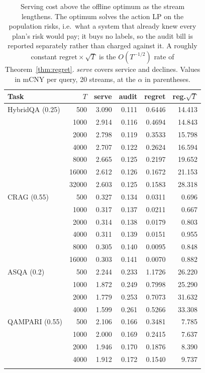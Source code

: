 \begin{table}[t]
\centering
\caption{Serving cost above the offline optimum as the stream lengthens. The optimum solves the action LP on the population risks, i.e.\ what a system that already knew every plan's risk would pay; it buys no labels, so the audit bill is reported separately rather than charged against it. A roughly constant $\mathrm{regret}\times\sqrt{T}$ is the $O(T^{-1/2})$ rate of Theorem~\ref{thm:regret}. \emph{serve} covers service and declines. Values in mCNY per query, 20 streams, at the $\alpha$ in parentheses.}
\label{tab:regret}
\footnotesize
\setlength{\tabcolsep}{4pt}
\begin{tabular}{lrrrrr}
\toprule
Task & $T$ & serve & audit & regret & reg.$\sqrt{T}$ \\
\midrule
HybridQA (0.25) & 500 & 3.090 & 0.111 & 0.6446 & 14.413 \\
 & 1000 & 2.914 & 0.116 & 0.4694 & 14.843 \\
 & 2000 & 2.798 & 0.119 & 0.3533 & 15.798 \\
 & 4000 & 2.707 & 0.122 & 0.2624 & 16.594 \\
 & 8000 & 2.665 & 0.125 & 0.2197 & 19.652 \\
 & 16000 & 2.612 & 0.126 & 0.1672 & 21.153 \\
 & 32000 & 2.603 & 0.125 & 0.1583 & 28.318 \\
\addlinespace[2pt]
CRAG (0.55) & 500 & 0.327 & 0.134 & 0.0311 & 0.696 \\
 & 1000 & 0.317 & 0.137 & 0.0211 & 0.667 \\
 & 2000 & 0.314 & 0.138 & 0.0179 & 0.803 \\
 & 4000 & 0.311 & 0.139 & 0.0151 & 0.955 \\
 & 8000 & 0.305 & 0.140 & 0.0095 & 0.848 \\
 & 16000 & 0.303 & 0.141 & 0.0070 & 0.882 \\
\addlinespace[2pt]
ASQA (0.2) & 500 & 2.244 & 0.233 & 1.1726 & 26.220 \\
 & 1000 & 1.872 & 0.249 & 0.7998 & 25.290 \\
 & 2000 & 1.779 & 0.253 & 0.7073 & 31.632 \\
 & 4000 & 1.599 & 0.261 & 0.5266 & 33.308 \\
\addlinespace[2pt]
QAMPARI (0.55) & 500 & 2.106 & 0.166 & 0.3481 & 7.785 \\
 & 1000 & 2.000 & 0.169 & 0.2415 & 7.637 \\
 & 2000 & 1.946 & 0.170 & 0.1876 & 8.390 \\
 & 4000 & 1.912 & 0.172 & 0.1540 & 9.737 \\
\addlinespace[2pt]
\bottomrule
\end{tabular}
\end{table}
